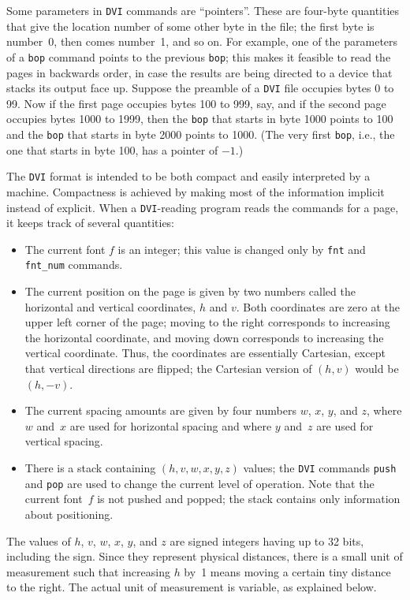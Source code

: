 \documentclass[10pt, a4paper]{article}
\begin{document}
Some parameters in \texttt{DVI} commands are ``pointers''. 
These are four-byte quantities that give the location number 
of some other byte in the file; 
the first byte is number~0, then comes number~1, and so on. 
For example, one of the parameters of a \texttt{bop} command 
points to the previous \texttt{bop};
this makes it feasible to read the pages in backwards order, 
in case the results are being directed to a device 
that stacks its output face up. 
Suppose the preamble of a \texttt{DVI} file occupies bytes 0 to 99. 
Now if the first page occupies bytes 100 to 999, say, 
and if the second page occupies bytes 1000 to 1999, 
then the \texttt{bop} that starts in byte 1000
points to 100 and the \texttt{bop} that starts in byte 2000 points to 1000. 
(The very first \texttt{bop}, 
i.e., the one that starts in byte 100, has a pointer of $-1$.)


The  \texttt{DVI} format is intended to be both 
compact and easily interpreted by a machine. 
Compactness is achieved by making most of the information implicit 
instead of explicit. 
When a \texttt{DVI}-reading program reads the commands for a page, 
it keeps track of several quantities: 
%
\begin{itemize}
\item
The current font $f$ is an integer; 
this value is changed only by \texttt{fnt} and \texttt{fnt\_num} commands. 
\item
The current position on the page 
is given by two numbers called the horizontal and vertical coordinates,
$h$ and $v$. 
Both coordinates are zero at the upper left corner of the page; 
moving to the right corresponds to increasing the horizontal coordinate, and
moving down corresponds to increasing the vertical coordinate. 
Thus, the coordinates are essentially Cartesian, 
except that vertical directions are flipped; 
the Cartesian version of $(h,v)$ would be $(h,-v)$.  
\item
The current spacing amounts 
are given by four numbers $w$, $x$, $y$, and $z$,
where $w$ and~$x$ are used for horizontal spacing and where $y$ and~$z$
are used for vertical spacing. 
\item
There is a stack containing $(h,v,w,x,y,z)$ values; 
the \texttt{DVI} commands \texttt{push} and \texttt{pop} are used 
to change the current level of operation. 
Note that the current font~$f$ is not pushed and popped; 
the stack contains only information about positioning.
\end{itemize}

The values of $h$, $v$, $w$, $x$, $y$, and $z$ are signed integers having up
to 32 bits, including the sign. Since they represent physical distances,
there is a small unit of measurement such that increasing $h$ by~1 means
moving a certain tiny distance to the right. The actual unit of
measurement is variable, as explained below. 
\end{document}
